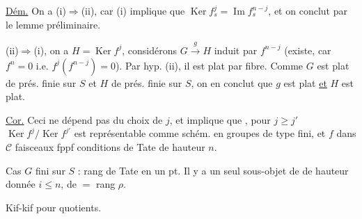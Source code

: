 \uline{Dém.} On a (i)$\Longrightarrow$(ii), car (i) implique que $\operatorname{Ker}f_s^j=\operatorname{Im}f_s^{n-j}$, et on conclut par le lemme préliminaire.

 (ii)$\Longrightarrow$(i), on a $H=\operatorname{Ker}f^j$, considérons $G\xrightarrow{g}H$ induit par $f^{n-j}$ (existe, car $f^n=0$ i.e. $f^j(f^{n-j})=0$). Par hyp. (ii), il est  plat par fibre. Comme $G$ est plat de prés. finie sur $S$ et $H$ de prés. finie sur $S$, on en conclut que $g$ est  plat \uline{et} $H$ est plat.

\uline{Cor.} Ceci ne dépend pas du choix de $j$, et implique que  ,  pour $j\geq j'$ $\operatorname{Ker}f^j/\operatorname{Ker}f^{j'}$ est représentable comme schém. en groupes de type fini, et $f$ dans $\mathcal C$ faisceaux  fppf    conditions de Tate de hauteur $n$.

Cas $G$ fini sur $S$ : rang de Tate en un pt.
Il y a un seul sous-objet de  de hauteur donnée $i\leq n$, de $=$ rang $\rho$.

Kif-kif pour quotients.
